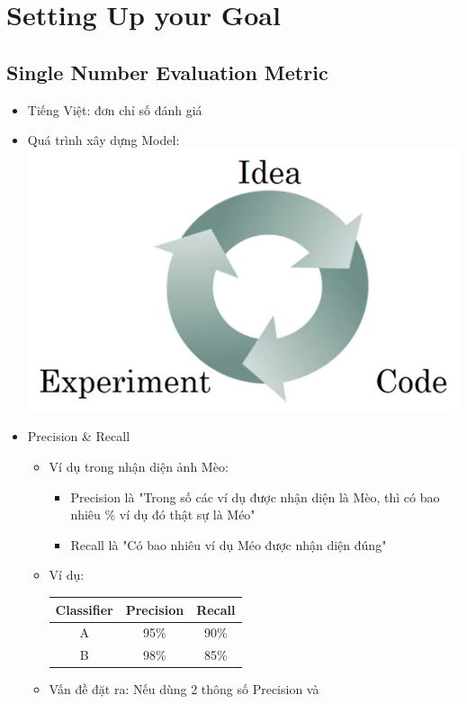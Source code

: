 \documentclass[12pt,a4paper]{report}
\begin{document}
\chapter{Setting Up your Goal}
	\section{Single Number Evaluation Metric}
		\begin{itemize}
			\item Tiếng Việt: đơn chỉ số đánh giá
			\item Quá trình xây dựng Model: \\ \includegraphics[scale=0.5]{1}
			\item Precision \& Recall
				\begin{itemize}
					\item Ví dụ trong nhận diện ảnh Mèo:
						\begin{itemize}
							\item Precision là "Trong số các ví dụ được nhận 
							diện là Mèo, thì có bao nhiêu \% ví dụ đó thật sự 
							là Méo"
							\item Recall là "Có bao nhiêu ví dụ Méo được nhận 
							diện đúng"
						\end{itemize}
					\item Ví dụ: \\
						\begin{tabular}{ | c | c c | }
							\hline
							Classifier & Precision & Recall \\ 
							\hline
							A & 95\% & 90\% \\  
						 	B & 98\% & 85\% \\
						 	\hline
						\end{tabular}
					\item Vấn đề đặt ra: Nếu dùng 2 thông số Precision và 

\end{itemize}
\end{itemize}
\end{document}
